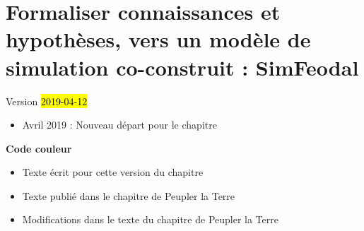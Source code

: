 \chapter{Formaliser connaissances et hypothèses, vers un modèle de simulation co-construit : SimFeodal}
\label{chap:chap2}
\begin{center}
	{\large Version \hl{2019-04-12}}
\end{center}

\begin{itemize}
	\item Avril 2019 : Nouveau départ pour le chapitre
\end{itemize}
\setcounter{minitocdepth}{2}
\minitoc

\textbf{Code couleur}
\begin{itemize}
	\item Texte écrit pour cette version du chapitre
	\item {\redroman Texte publié dans le chapitre de Peupler la Terre}
	\item {\blueroman Modifications dans le texte du chapitre de Peupler la Terre}
\end{itemize}

\clearpage

